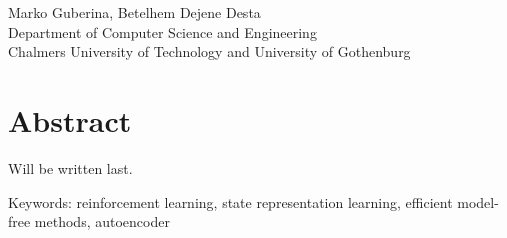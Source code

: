 \oneLineTitle\\
\oneLineSubtitle\\
Marko Guberina,
Betelhem Dejene Desta\\
Department of Computer Science and Engineering\\
Chalmers University of Technology and University of Gothenburg\setlength{\parskip}{0.5cm}

\thispagestyle{plain}			%
\setlength{\parskip}{0pt plus 1.0pt}
\section*{Abstract}
Will be written last.

\vfill
Keywords: reinforcement learning, state representation learning, efficient model-free methods,
autoencoder


\newpage				%
\thispagestyle{empty}
\mbox{}
